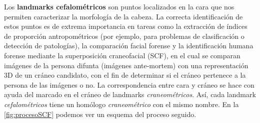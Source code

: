     \noindent Los \textbf{landmarks cefalométricos} son puntos localizados en la cara que nos permiten caracterizar la morfología de la cabeza. La correcta identificación de estos puntos es de extrema importancia en tareas como la extracción de índices de proporción antropométricos (por ejemplo, para problemas de clasificación o detección de patologías), la comparación facial forense y la identificación humana forense mediante la superposición craneofacial (SCF), en el cual se comparan imágenes de la persona difunta (imágenes ante-mortem) con una representación 3D de un cráneo candidato, con el fin de determinar si el cráneo pertenece a la persona de las imágenes o no. La correspondencia entre cara y cráneo se hace con ayuda del marcado en el cráneo de landmarks \textit{craneométricos}. Así, cada landmark \textit{cefalométricos} tiene un homólogo \textit{craneométrico} con el mismo nombre. En la \autoref{fig:procesoSCF}  podemos ver un esquema del proceso seguido.

    \medskip


